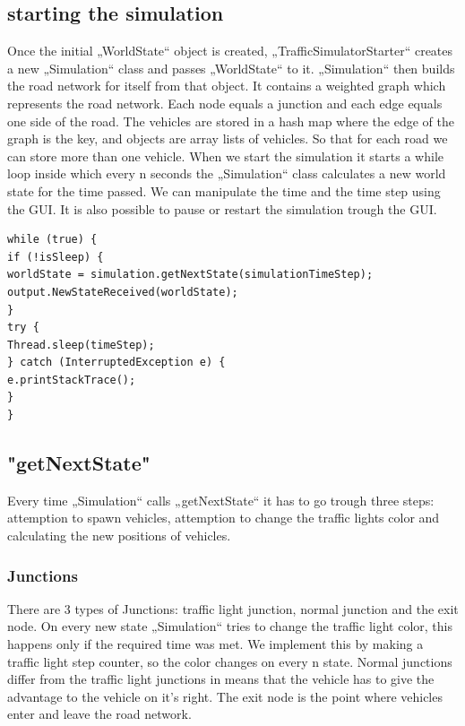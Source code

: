 \documentclass[a4paper,12pt]{article}
\begin{document}
\subsection{starting the simulation}
Once the initial „WorldState“ object is created,  „TrafficSimulatorStarter“  creates a new „Simulation“ class and passes „WorldState“  to it. „Simulation“ then builds the road network for itself from that object. It contains a weighted graph which represents the road network. Each node equals a junction and each edge equals one side of the road. The vehicles are stored in a hash map where the edge of the graph is the key, and objects are array lists of vehicles. So that for each road we can store more than one vehicle.
\newline
When we start the simulation it starts a while loop inside which every n seconds the „Simulation“ class calculates a new world state for the time passed. We can manipulate the time and the time step using the GUI. It is also possible to pause or restart the simulation trough the GUI.

\begin{lstlisting}
while (true) {
if (!isSleep) {
worldState = simulation.getNextState(simulationTimeStep);
output.NewStateReceived(worldState);
}
try {
Thread.sleep(timeStep);
} catch (InterruptedException e) {
e.printStackTrace();
}
}
\end{lstlisting}

\subsection{"getNextState"}
Every time „Simulation“ calls „getNextState“ it has to go trough three steps: attemption to spawn vehicles, attemption to change the traffic lights color and calculating the new positions of vehicles.\newline
\subsubsection{Junctions}
There are 3 types of Junctions: traffic light junction, normal junction and the exit node. On every new state „Simulation“ tries to change the traffic light color, this happens only if the required time was met. We implement this by making a traffic light step counter, so the color changes on every n state. Normal junctions differ from the traffic light junctions in means that the vehicle has to give the advantage to the vehicle on it's right. The exit node is the point where vehicles enter and leave the road network.
\newline
\end{document}
